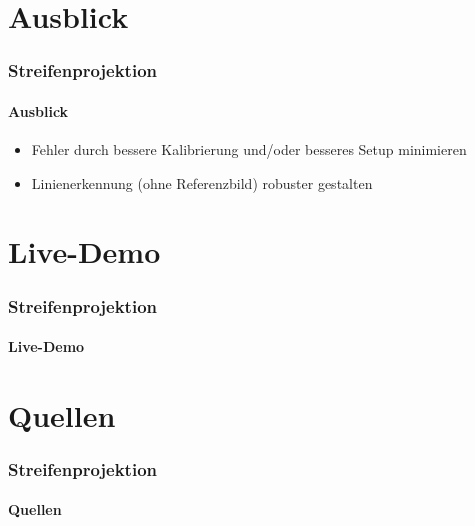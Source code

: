 \documentclass[xcolor=dvipsnames]{beamer}
\begin{document}
\section{Ausblick}

\begin{frame}
	\frametitle{Streifenprojektion}
	\framesubtitle{Ausblick}

	\begin{itemize}
		\item Fehler durch bessere Kalibrierung und/oder besseres Setup minimieren
		\item Linienerkennung (ohne Referenzbild) robuster gestalten
	\end{itemize}

\end{frame}


\section{Live-Demo} 
\begin{frame}
	\frametitle{Streifenprojektion}
	\framesubtitle{Live-Demo}

\end{frame}


\section{Quellen} 
\begin{frame}
	\frametitle{Streifenprojektion}
	\framesubtitle{Quellen}
	
\end{frame}
\end{document}
